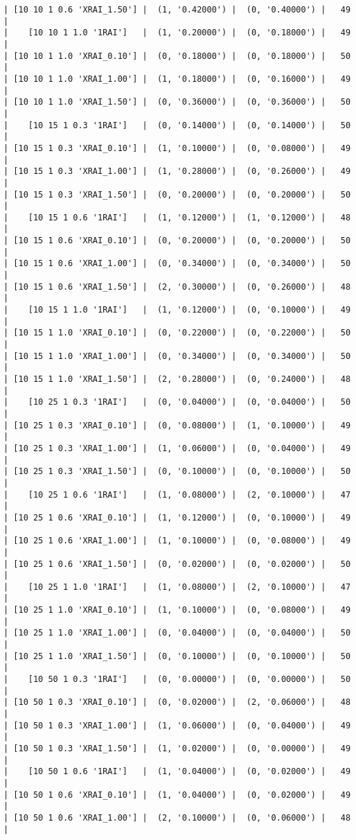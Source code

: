\documentclass{article}
\begin{document}
\begin{verbatim}
| [10 10 1 0.6 'XRAI_1.50'] |  (1, '0.42000') |  (0, '0.40000') |   49  |
|    [10 10 1 1.0 '1RAI']   |  (1, '0.20000') |  (0, '0.18000') |   49  |
| [10 10 1 1.0 'XRAI_0.10'] |  (0, '0.18000') |  (0, '0.18000') |   50  |
| [10 10 1 1.0 'XRAI_1.00'] |  (1, '0.18000') |  (0, '0.16000') |   49  |
| [10 10 1 1.0 'XRAI_1.50'] |  (0, '0.36000') |  (0, '0.36000') |   50  |
|    [10 15 1 0.3 '1RAI']   |  (0, '0.14000') |  (0, '0.14000') |   50  |
| [10 15 1 0.3 'XRAI_0.10'] |  (1, '0.10000') |  (0, '0.08000') |   49  |
| [10 15 1 0.3 'XRAI_1.00'] |  (1, '0.28000') |  (0, '0.26000') |   49  |
| [10 15 1 0.3 'XRAI_1.50'] |  (0, '0.20000') |  (0, '0.20000') |   50  |
|    [10 15 1 0.6 '1RAI']   |  (1, '0.12000') |  (1, '0.12000') |   48  |
| [10 15 1 0.6 'XRAI_0.10'] |  (0, '0.20000') |  (0, '0.20000') |   50  |
| [10 15 1 0.6 'XRAI_1.00'] |  (0, '0.34000') |  (0, '0.34000') |   50  |
| [10 15 1 0.6 'XRAI_1.50'] |  (2, '0.30000') |  (0, '0.26000') |   48  |
|    [10 15 1 1.0 '1RAI']   |  (1, '0.12000') |  (0, '0.10000') |   49  |
| [10 15 1 1.0 'XRAI_0.10'] |  (0, '0.22000') |  (0, '0.22000') |   50  |
| [10 15 1 1.0 'XRAI_1.00'] |  (0, '0.34000') |  (0, '0.34000') |   50  |
| [10 15 1 1.0 'XRAI_1.50'] |  (2, '0.28000') |  (0, '0.24000') |   48  |
|    [10 25 1 0.3 '1RAI']   |  (0, '0.04000') |  (0, '0.04000') |   50  |
| [10 25 1 0.3 'XRAI_0.10'] |  (0, '0.08000') |  (1, '0.10000') |   49  |
| [10 25 1 0.3 'XRAI_1.00'] |  (1, '0.06000') |  (0, '0.04000') |   49  |
| [10 25 1 0.3 'XRAI_1.50'] |  (0, '0.10000') |  (0, '0.10000') |   50  |
|    [10 25 1 0.6 '1RAI']   |  (1, '0.08000') |  (2, '0.10000') |   47  |
| [10 25 1 0.6 'XRAI_0.10'] |  (1, '0.12000') |  (0, '0.10000') |   49  |
| [10 25 1 0.6 'XRAI_1.00'] |  (1, '0.10000') |  (0, '0.08000') |   49  |
| [10 25 1 0.6 'XRAI_1.50'] |  (0, '0.02000') |  (0, '0.02000') |   50  |
|    [10 25 1 1.0 '1RAI']   |  (1, '0.08000') |  (2, '0.10000') |   47  |
| [10 25 1 1.0 'XRAI_0.10'] |  (1, '0.10000') |  (0, '0.08000') |   49  |
| [10 25 1 1.0 'XRAI_1.00'] |  (0, '0.04000') |  (0, '0.04000') |   50  |
| [10 25 1 1.0 'XRAI_1.50'] |  (0, '0.10000') |  (0, '0.10000') |   50  |
|    [10 50 1 0.3 '1RAI']   |  (0, '0.00000') |  (0, '0.00000') |   50  |
| [10 50 1 0.3 'XRAI_0.10'] |  (0, '0.02000') |  (2, '0.06000') |   48  |
| [10 50 1 0.3 'XRAI_1.00'] |  (1, '0.06000') |  (0, '0.04000') |   49  |
| [10 50 1 0.3 'XRAI_1.50'] |  (1, '0.02000') |  (0, '0.00000') |   49  |
|    [10 50 1 0.6 '1RAI']   |  (1, '0.04000') |  (0, '0.02000') |   49  |
| [10 50 1 0.6 'XRAI_0.10'] |  (1, '0.04000') |  (0, '0.02000') |   49  |
| [10 50 1 0.6 'XRAI_1.00'] |  (2, '0.10000') |  (0, '0.06000') |   48  |

\end{verbatim}
\end{document}
